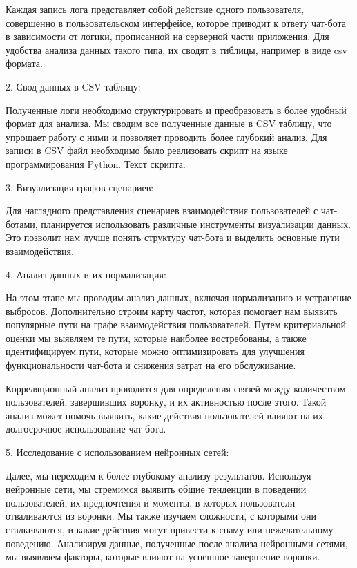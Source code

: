 \documentclass{article}
\begin{document}
\item{

}

Каждая запись лога представляет собой действие одного пользователя, совершенно в пользовательском интерфейсе, которое приводит к ответу чат-бота в зависимости от логики, прописанной на серверной части приложения. Для удобства анализа данных такого типа, их сводят в тиблицы, например в виде csv формата. 

2. Свод данных в CSV таблицу:

Полученные логи необходимо структурировать и преобразовать в более удобный формат для анализа. Мы сводим все полученные данные в CSV таблицу, что упрощает работу с ними и позволяет проводить более глубокий анализ. Для записи в CSV файл необходимо было реализовать скрипт на языке программирования Python. Текст скрипта.


3. Визуализация графов сценариев:

Для наглядного представления сценариев взаимодействия пользователей с чат-ботами, планируется использовать различные инструменты визуализации данных. Это позволит нам лучше понять структуру чат-бота и выделить основные пути взаимодействия.

4. Анализ данных и их нормализация:

На этом этапе мы проводим анализ данных, включая нормализацию и устранение выбросов. Дополнительно строим карту частот, которая помогает нам выявить популярные пути на графе взаимодействия пользователей. Путем критериальной оценки мы выявляем те пути, которые наиболее востребованы, а также идентифицируем пути, которые можно оптимизировать для улучшения функциональности чат-бота и снижения затрат на его обслуживание.

Корреляционный анализ проводится для определения связей между количеством пользователей, завершивших воронку, и их активностью после этого. Такой анализ может помочь выявить, какие действия пользователей влияют на их долгосрочное использование чат-бота.

5. Исследование с использованием нейронных сетей:

Далее, мы переходим к более глубокому анализу результатов. Используя нейронные сети, мы стремимся выявить общие тенденции в поведении пользователей, их предпочтения и моменты, в которых пользователи отваливаются из воронки. Мы также изучаем сложности, с которыми они сталкиваются, и какие действия могут привести к спаму или нежелательному поведению. Анализируя данные, полученные после анализа нейронными сетями, мы выявляем факторы, которые влияют на успешное завершение воронки.
\end{document}
